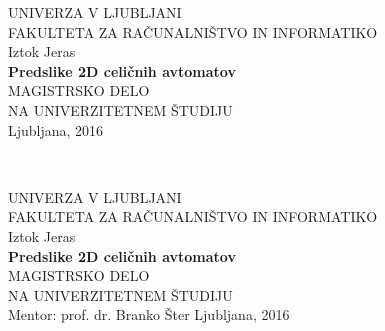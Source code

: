 \documentclass[12pt,a4paper,openany,twoside]{book}
\begin{document}
\thispagestyle{empty} 
\begin{center}
             {\large UNIVERZA V LJUBLJANI\\
                     FAKULTETA ZA RAČUNALNIŠTVO IN INFORMATIKO\\}
\vspace{3cm} {\large Iztok Jeras}\\
\vspace{2cm} {\large \textbf{Predslike 2D celičnih avtomatov}}\\
\vspace{2cm} {MAGISTRSKO DELO\\ NA UNIVERZITETNEM ŠTUDIJU}\\
\vfill       {\Large Ljubljana, 2016}
\end{center}
\newpage
\ \thispagestyle{empty}
\newpage

\thispagestyle{empty} 
\begin{center}
             {\large UNIVERZA V LJUBLJANI\\
                     FAKULTETA ZA RAČUNALNIŠTVO IN INFORMATIKO\\}
\vspace{3cm} {\large Iztok Jeras}\\
\vspace{2cm} {\large \textbf{Predslike 2D celičnih avtomatov}}\\
\vspace{2cm} {MAGISTRSKO DELO\\ NA UNIVERZITETNEM ŠTUDIJU}\\
\vspace{2cm} {\Large Mentor: prof. dr. Branko Šter}
\vfill       {\Large Ljubljana, 2016}
\end{center}
\newpage
\ \thispagestyle{empty}
\newpage

\thispagestyle{empty}
\end{document}
